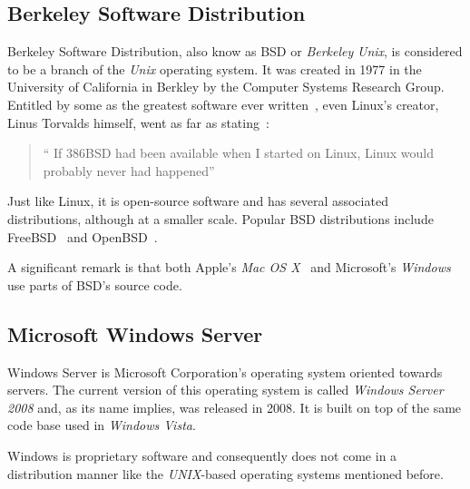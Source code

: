 \subsection{Berkeley Software Distribution}
Berkeley Software Distribution, also know as BSD or \textit{Berkeley} \textit{Unix}, is considered to be a branch of the \textit{Unix} operating system. It was created in 1977 in the University of California in Berkley by the Computer Systems Research Group.  Entitled by some as the greatest software ever written~\cite{ greatest_software_ever_written}, even Linux's creator, Linus Torvalds himself, went as far as stating~\cite{ interview_linus}: 
\begin{quote}
  `` If 386BSD had been available when I started on Linux, Linux would probably never had happened''
\end{quote}
Just like Linux, it is open-source software and has several associated distributions, although at a smaller scale. Popular BSD distributions include FreeBSD~\cite{freebsd} and OpenBSD~\cite{openbsd}.

A significant remark is that both Apple's \textit{Mac OS X}~\cite{ leopard_os_foundations} and Microsoft's \textit{Windows}~\cite{ bsd_code_windows} use parts of BSD's source code.

\subsection{Microsoft Windows Server}
Windows Server is Microsoft Corporation's operating system oriented towards servers. The current version of this operating system is called \textit{Windows Server 2008} and, as its name implies, was released in 2008. It is built on top of the same code base used in \textit{Windows Vista}.

Windows is proprietary software and consequently does not come in a distribution manner like the \textit{UNIX}-based operating systems mentioned before.
